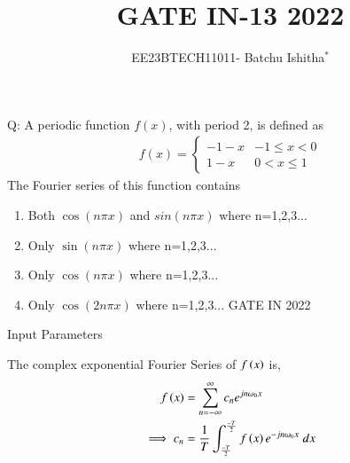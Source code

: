 \documentclass[journal,12pt,onecolumn]{IEEEtran}
\theoremstyle{remark}
\begin{document}
\let\vec\mathbf



\title{ GATE IN-13 2022}
\author{EE23BTECH11011- Batchu Ishitha$^{*}$%
}
\maketitle




\bigskip

\renewcommand{\thefigure}{\theenumi}
\renewcommand{\thetable}{\theenumi}

Q: A periodic function $f(x)$, with period 2, is defined as \\
   \begin{align}   
   f(x) =
   \begin{cases}
    -1-x & -1 \leq x<0 \\
     1-x &  0 <x \leq1 
   \end{cases}
   \end{align} 
   The Fourier series of this function contains \\
\begin{enumerate}[label=\Alph*.]
\item Both $\cos(n\pi x)$ and $sin(n\pi x)$ where n=1,2,3...
\item Only $\sin(n\pi x)$ where n=1,2,3...
\item Only $\cos(n\pi x)$ where n=1,2,3...
\item Only $\cos(2n\pi x)$ where n=1,2,3...  \hfill{GATE IN 2022 }
\end{enumerate} 

\solution

\begin{table}[!ht]    
    \centering
    
    \caption{Input Parameters}
    \label{table:ishitha.g22.in.13.t1}
\end{table}

The complex exponential Fourier Series of $f\left(x\right)$ is,
\begin{align}
    f\left(x\right)&=\sum_{n=-\infty}^{\infty}c_ne^{jn\omega_{0}x}\\
    \implies c_n&=\frac{1}{T}\int_{\frac{-T}{2}}^{\frac{-T}{2}}f\left(x\right)e^{-jn\omega_{0}x}\;dx\\
\end{align}    
\end{document}
